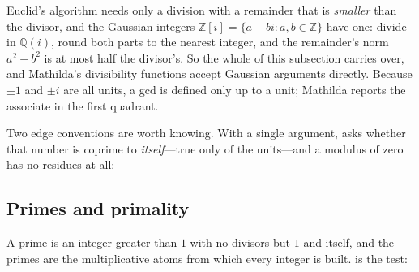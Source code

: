 Euclid's algorithm needs only a division with a remainder that is \emph{smaller} than the
divisor, and the Gaussian integers
\(\mathbb{Z}[i]=\{a+bi : a,b\in\mathbb{Z}\}\) have one: divide in \(\mathbb{Q}(i)\), round
both parts to the nearest integer, and the remainder's norm \(a^{2}+b^{2}\) is at most half
the divisor's. So the whole of this subsection carries over, and Mathilda's divisibility
functions accept Gaussian arguments directly. Because \(\pm1\) and \(\pm i\) are all units,
a gcd is defined only up to a unit; Mathilda reports the associate in the first quadrant.

\begin{codepairs}
\end{codepairs}

Two edge conventions are worth knowing. With a single argument,  asks
whether that number is coprime to \emph{itself}---true only of the units---and a modulus of
zero has no residues at all:

\begin{codepairs}
\end{codepairs}

\subsection{Primes and primality}
\label{ssec:nt-primes}

A prime is an integer greater than \(1\) with no divisors but \(1\) and itself, and the
primes are the multiplicative atoms from which every integer is built.  is the
test:

